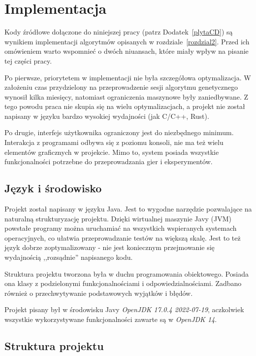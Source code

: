 \chapter{Implementacja}
\thispagestyle{chapterBeginStyle}
\label{rozdzial3}

Kody źródłowe dołączone do niniejszej pracy (patrz Dodatek~\ref{plytaCD}) są wynikiem implementacji algorytmów opisanych w rozdziale~\ref{rozdzial2}. Przed ich omówieniem warto wspomnieć o dwóch niuansach, które miały wpływ na pisanie tej części pracy.

Po pierwsze, priorytetem w implementacji nie była szczegółowa optymalizacja. W założeniu czas przydzielony na przeprowadzenie sesji algorytmu genetycznego wynosił kilka miesięcy, natomiast ograniczenia maszynowe były zaniedbywane. Z tego powodu praca nie skupia się na wielu optymalizacjach, a projekt nie został napisany w języku bardzo wysokiej wydajności (jak C/C++, Rust). 

Po drugie, interfejs użytkownika ograniczony jest do niezbędnego minimum. Interakcja z programami odbywa się z poziomu konsoli, nie ma też wielu elementów graficznych w projekcie. Mimo to, system posiada wszystkie funkcjonalności potrzebne do przeprowadzania gier i eksperymentów.

\section{Język i środowisko}

Projekt został napisany w języku Java. Jest to wygodne narzędzie pozwalające na naturalną strukturyzację projektu. Dzięki wirtualnej maszynie Javy (JVM) powstałe programy można uruchamiać na wszystkich wspieranych systemach operacyjnych, co ułatwia przeprowadzanie testów na większą skalę. Jest to też język dobrze zoptymalizowany - nie jest koniecznym przejmowanie się wydajnością ,,rozsądnie'' napisanego kodu.

Struktura projektu tworzona była w duchu programowania obiektowego. Posiada ona klasy z podzielonymi funkcjonalnościami i odpowiedzialnościami. Zadbano również o przechwytywanie podstawowych wyjątków i błędów.

Projekt pisany był w środowisku Javy \textit{OpenJDK 17.0.4 2022-07-19}, aczkolwiek wszystkie wykorzystywane funkcjonalności zawarte są w \textit{OpenJDK 14}.

\section{Struktura projektu}
\label{porozdzial3-2}


